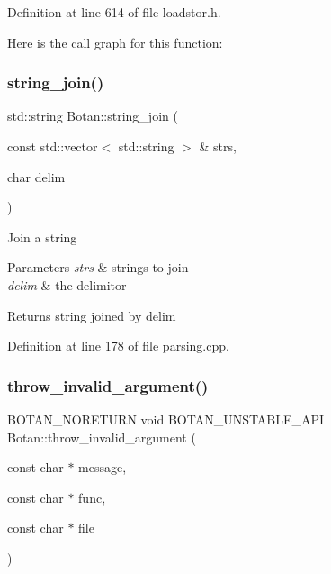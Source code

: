 Definition at line 614 of file loadstor.\+h.

Here is the call graph for this function\+:
\mbox{\label{namespace_botan_a8ffe6aa56dd7683af8e6408daf290312}} 
\subsubsection{\texorpdfstring{string\+\_\+join()}{string\_join()}}
{\footnotesize\ttfamily std\+::string Botan\+::string\+\_\+join (\begin{DoxyParamCaption}\item[{const std\+::vector$<$ std\+::string $>$ \&}]{strs,  }\item[{char}]{delim }\end{DoxyParamCaption})}

Join a string 
\begin{DoxyParams}{Parameters}
{\em strs} & strings to join \\
\hline
{\em delim} & the delimitor \\
\hline
\end{DoxyParams}
\begin{DoxyReturn}{Returns}
string joined by delim 
\end{DoxyReturn}


Definition at line 178 of file parsing.\+cpp.

\mbox{\label{namespace_botan_aaf096546028928a2d760aa504a9a2a74}} 
\subsubsection{\texorpdfstring{throw\+\_\+invalid\+\_\+argument()}{throw\_invalid\_argument()}}
{\footnotesize\ttfamily B\+O\+T\+A\+N\+\_\+\+N\+O\+R\+E\+T\+U\+RN void B\+O\+T\+A\+N\+\_\+\+U\+N\+S\+T\+A\+B\+L\+E\+\_\+\+A\+PI Botan\+::throw\+\_\+invalid\+\_\+argument (\begin{DoxyParamCaption}\item[{const char $\ast$}]{message,  }\item[{const char $\ast$}]{func,  }\item[{const char $\ast$}]{file }\end{DoxyParamCaption})}

